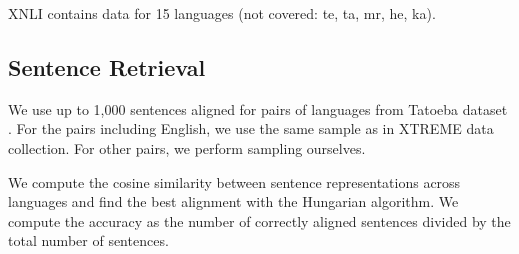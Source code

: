 XNLI contains data for 15 languages (not covered: te, ta, mr, he, ka).

\subsection{Sentence Retrieval}
We use up to 1,000 sentences aligned for pairs of languages from Tatoeba dataset \cite{artetxe_massively_2019}. For the pairs including English, we use the same sample as in XTREME data collection. For other pairs, we perform sampling ourselves. 

We compute the cosine similarity between sentence representations across languages and find the best alignment with the Hungarian algorithm\cite{kuhn_hungarian_1955}. We compute the accuracy as the number of correctly aligned sentences divided by the total number of sentences.
